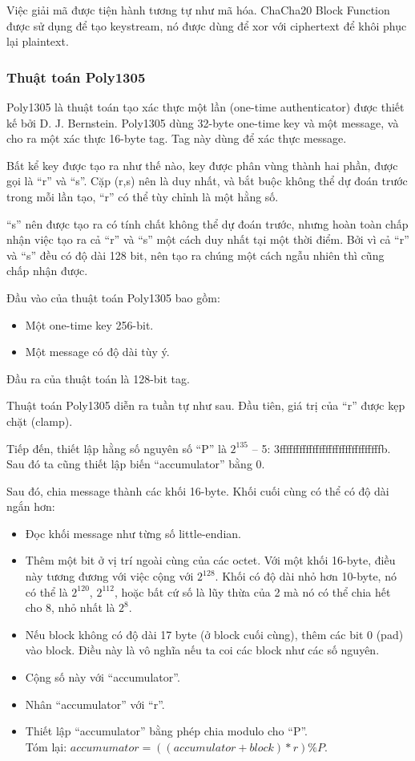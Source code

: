 Việc giải mã được tiện hành tương tự như mã hóa. ChaCha20 Block Function được sử dụng để tạo keystream, nó được dùng để \acrshort{xor} với ciphertext để khôi phục lại plaintext.

\subsubsection{Thuật toán Poly1305}
\label{Poly1305Algorithm}

Poly1305 là thuật toán tạo xác thực một lần (one-time authenticator) được thiết kế bởi D. J. Bernstein. Poly1305 dùng 32-byte one-time key và một message, và cho ra một xác thực 16-byte tag. Tag này dùng để xác thực message.

Bất kể key được tạo ra như thế nào, key được phân vùng thành hai phần, được gọi là ``r'' và ``s''. Cặp (r,s) nên là duy nhất, và bắt buộc không thể dự đoán trước trong mỗi lần tạo, ``r'' có thể tùy chỉnh là một hằng số.

``s'' nên được tạo ra có tính chất không thể dự đoán trước, nhưng hoàn toàn chấp nhận việc tạo ra cả ``r'' và ``s'' một cách duy nhất tại một thời điểm. Bởi vì cả ``r'' và ``s'' đều có độ dài 128 bit, nên tạo ra chúng một cách ngẫu nhiên thì cũng chấp nhận được.

Đầu vào của thuật toán Poly1305 bao gồm:

\begin{itemize}
    \item Một one-time key 256-bit.
    \item Một message có độ dài tùy ý.
\end{itemize}

Đầu ra của thuật toán là 128-bit tag.

Thuật toán Poly1305 diễn ra tuần tự như sau. Đầu tiên, giá trị của ``r'' được kẹp chặt (clamp).

Tiếp đến, thiết lập hằng số nguyên số ``P'' là $2^{135}$ – 5: 3fffffffffffffffffffffffffffffffb. Sau đó ta cũng thiết lập biến ``accumulator'' bằng 0.

Sau đó, chia message thành các khối 16-byte. Khối cuối cùng có thể có độ dài ngắn hơn:

\begin{itemize}
    \item Đọc khối message như từng số little-endian.
    \item Thêm một bit ở vị trí ngoài cùng của các octet. Với một khối 16-byte, điều này tương đương với việc cộng với $2^{128}$. Khối có độ dài nhỏ hơn 10-byte, nó có thể là $2^{120}$, $2^{112}$, hoặc bất cứ số là lũy thừa của 2 mà nó có thể chia hết cho 8, nhỏ nhất là $2^8$.
    \item Nếu block không có độ dài 17 byte (ở block cuối cùng), thêm các bit 0 (pad) vào block. Điều này là vô nghĩa nếu ta coi các block như các số nguyên.
    \item Cộng số này với ``accumulator''.
    \item Nhân ``accumulator'' với ``r''.
    \item Thiết lập ``accumulator'' bằng phép chia modulo cho ``P''. \\Tóm lại: $accumumator = ((accumulator+block)*r) \% P$.
\end{itemize}

